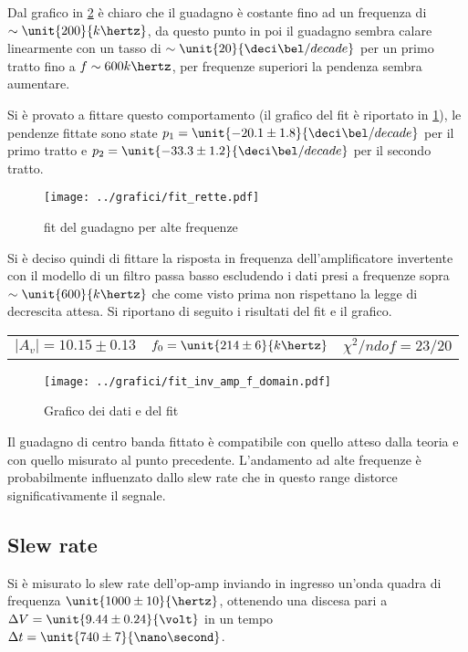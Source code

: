 \documentclass[10pt,a4paper]{article}
\begin{document}
Dal grafico in \figurename{\ref{palle}} è chiaro che il guadagno è costante fino ad un frequenza di $\sim \unit{200}{k\hertz}$, da questo punto in poi il guadagno sembra calare linearmente con un tasso di $\sim \unit{20}{\deci\bel /decade}$ per un primo tratto fino a $f \sim {600}{k\hertz}$, per frequenze superiori la pendenza sembra aumentare.

Si è provato a fittare questo comportamento (il grafico del fit è riportato in \figurename{\ref{rette}}), le pendenze fittate sono state $p_1 = \unit{-20.1 \pm 1.8}{\deci\bel/decade}$ per il primo tratto e $p_2 =\unit{-33.3 \pm 1.2}{\deci\bel/decade}$ per il secondo tratto.

\begin{figure}[H]
	\centering
	\texttt{[image: ../grafici/fit\_rette.pdf]}
	\caption{fit del guadagno per alte frequenze}
	\label{rette}
\end{figure}

Si è deciso quindi di fittare la risposta in frequenza dell'amplificatore invertente con il modello di un filtro passa basso escludendo i dati presi a frequenze sopra $\sim \unit{600}{k\hertz}$ che come visto prima non rispettano la legge di decrescita attesa.  Si riportano di seguito i risultati del fit e il grafico.

\begin{table}[H]
	\centering
	\begin{tabular}{ccc}
	$|A_v| = 10.15 \pm 0.13$	&	$f_0 = \unit{214 \pm 6}{k\hertz}$	&	$\chi^2/ndof = 23 / 20$\\
	\end{tabular}
\end{table}

\begin{figure}[h!]
	\centering
	\texttt{[image: ../grafici/fit\_inv\_amp\_f\_domain.pdf]}
	\caption{Grafico dei dati e del fit}
	\label{palle}
\end{figure}

Il guadagno di centro banda fittato è compatibile con quello atteso dalla teoria e con quello misurato al punto precedente.
L'andamento ad alte frequenze è probabilmente influenzato dallo slew rate che in questo range distorce significativamente il segnale.
\pagebreak
\subsection{Slew rate}
Si è misurato lo slew rate dell'op-amp inviando in ingresso un'onda quadra di frequenza $\unit{1000 \pm 10}{\hertz}$, ottenendo una discesa pari a  $\Delta V = \unit{9.44 \pm 0.24}{\volt}$ in un tempo $\Delta t = \unit{740 \pm 7}{\nano\second}$.
\end{document}

